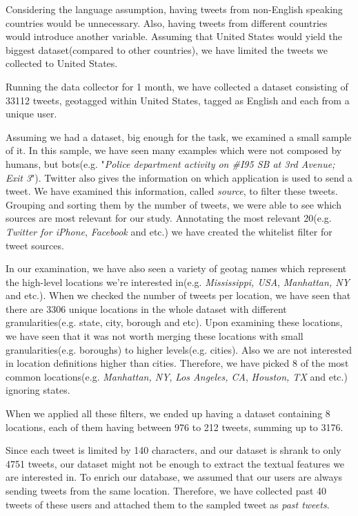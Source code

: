 \documentclass[twoside,11pt]{article}
\begin{document}
Considering the language assumption, having tweets from non-English speaking countries would be unnecessary. Also, having tweets from different countries would introduce another variable. Assuming that United States would yield the biggest dataset(compared to other countries), we have limited the tweets we collected to United States.

Running the data collector for 1 month, we have collected a dataset consisting of 33112 tweets, geotagged within United States, tagged as English and each from a unique user.

Assuming we had a dataset, big enough for the task, we examined a small sample of it. In this sample, we have seen many examples which were not composed by humans, but bots(e.g. "\textit{Police department activity on \#I95 SB at 3rd Avenue; Exit 3}"). Twitter also gives the information on which application is used to send a tweet. We have examined this information, called \textit{source}, to filter these tweets. Grouping and sorting them by the number of tweets, we were able to see which sources are most relevant for our study. Annotating the most relevant 20(e.g. \textit{Twitter for iPhone}, \textit{Facebook} and etc.) we have created the whitelist filter for tweet sources.

In our examination, we have also seen a variety of geotag names which represent the high-level locations we're interested in(e.g. \textit{Mississippi, USA}, \textit{Manhattan, NY} and etc.). When we checked the number of tweets per location, we have seen that there are 3306 unique locations in the whole dataset with different granularities(e.g. state, city, borough and etc). Upon examining these locations, we have seen that it was not worth merging these locations with small granularities(e.g. boroughs) to higher levels(e.g. cities). Also we are not interested in location definitions higher than cities. Therefore, we have picked 8 of the most common locations(e.g. \textit{Manhattan, NY}, \textit{Los Angeles, CA}, \textit{Houston, TX} and etc.) ignoring states. 

When we applied all these filters, we ended up having a dataset containing 8 locations, each of them having between 976 to 212 tweets, summing up to 3176.

Since each tweet is limited by 140 characters, and our dataset is shrank to only 4751 tweets, our dataset might not be enough to extract the textual features we are interested in. To enrich our database, we assumed that our users are always sending tweets from the same location. Therefore, we have collected past 40 tweets of these users and attached them to the sampled tweet as \textit{past tweets}.
\end{document}
